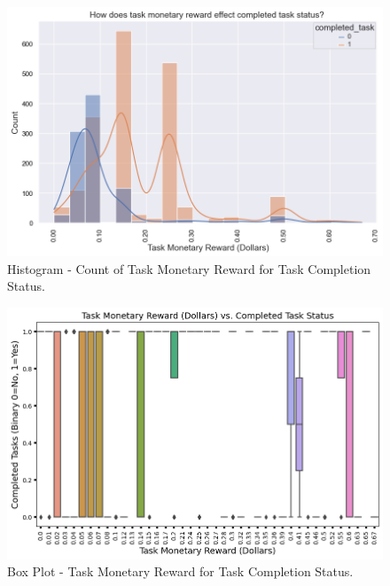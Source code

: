\documentclass[11pt]{article}
\begin{document}
\begin{figure}[hbt!]
  \centering
  \includegraphics[width=420pt]{figures/task-monetary_reward_in_dollars-vs-completed_task-histogram}
  \caption{Histogram - Count of Task Monetary Reward for Task Completion Status.}
\end{figure}

\begin{figure}[hbt!]
  \centering
  \includegraphics[width=420pt]{figures/task-monetary_reward_in_dollars-vs-completed_task-boxplot}
  \caption{Box Plot - Task Monetary Reward for Task Completion Status.}
\end{figure}

\clearpage
\end{document}
